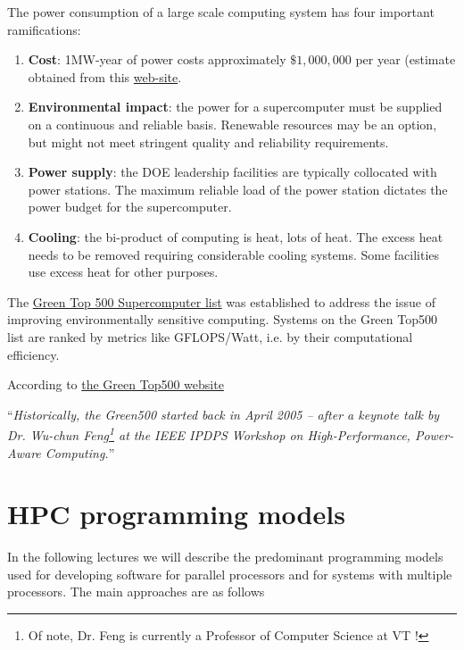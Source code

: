  The power consumption of a large scale computing system has four important ramifications: 
 \begin{enumerate}
     \item {\bf Cost}:  1MW-year of power costs approximately $\$1,000,000$ per year (estimate obtained from this \href{https://www.aqua-calc.com/calculate/electricity-cost}{web-site}.
     \item {\bf Environmental impact}: the power for a supercomputer must be supplied on a continuous and reliable basis. Renewable resources may be an option, but might not meet stringent quality and reliability requirements.
     \item {\bf Power supply}: the DOE leadership facilities are typically collocated with power stations. The maximum reliable load of the power station dictates the power budget for the supercomputer.
     \item {\bf Cooling}: the bi-product of computing is heat, lots of heat. The excess heat needs to be removed requiring considerable cooling systems. Some facilities use excess heat for other purposes.
 \end{enumerate}
The 
\href{https://www.top500.org/green500/lists/2019/06/}{Green Top 500 Supercomputer list} was established to address the issue of improving environmentally sensitive computing. Systems on the Green Top500 list are ranked by metrics like GFLOPS/Watt, i.e. by their computational efficiency. 

According to \href{https://www.top500.org/green500/about/}{the Green Top500 website} 

``\emph{Historically, the Green500 started back in April 2005 – after a keynote talk by Dr. Wu-chun Feng\footnote{Of note, Dr. Feng is currently a Professor of Computer Science at VT !} at the IEEE IPDPS Workshop on High-Performance, Power-Aware Computing.}'' 



\section{HPC programming models}

In the following lectures we will describe the predominant programming models used for developing software for parallel processors and for systems with multiple processors. The main approaches are as follows

